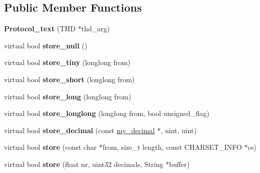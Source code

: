 \subsection*{Public Member Functions}
\begin{DoxyCompactItemize}
\item 
\mbox{\label{classProtocol__text_a5f7730b97e8cbd72ff38d5e8e749c69f}} 
{\bfseries Protocol\+\_\+text} (T\+HD $\ast$thd\+\_\+arg)
\item 
\mbox{\label{classProtocol__text_a603091a96e47c08a36a8cc1b78218771}} 
virtual bool {\bfseries store\+\_\+null} ()
\item 
\mbox{\label{classProtocol__text_a4ff07a6ef8c0d497e5b2623e58ab9e23}} 
virtual bool {\bfseries store\+\_\+tiny} (longlong from)
\item 
\mbox{\label{classProtocol__text_ab48b36bece3871ece446925a4407dbd9}} 
virtual bool {\bfseries store\+\_\+short} (longlong from)
\item 
\mbox{\label{classProtocol__text_aa25e20c0847a578783759c6891569502}} 
virtual bool {\bfseries store\+\_\+long} (longlong from)
\item 
\mbox{\label{classProtocol__text_a30619868730da2f514784703b109f24b}} 
virtual bool {\bfseries store\+\_\+longlong} (longlong from, bool unsigned\+\_\+flag)
\item 
\mbox{\label{classProtocol__text_adbb5721eb63b287efa1641ee1d1c3a8b}} 
virtual bool {\bfseries store\+\_\+decimal} (const \mbox{\hyperlink{classmy__decimal}{my\+\_\+decimal}} $\ast$, uint, uint)
\item 
\mbox{\label{classProtocol__text_a7817101a8202a2504e98dc61beb34219}} 
virtual bool {\bfseries store} (const char $\ast$from, size\+\_\+t length, const C\+H\+A\+R\+S\+E\+T\+\_\+\+I\+N\+FO $\ast$cs)
\item 
\mbox{\label{classProtocol__text_ac32c3a049b50b024b83344e3c9b863ed}} 
virtual bool {\bfseries store} (float nr, uint32 decimals, String $\ast$buffer)

\end{DoxyCompactItemize}
